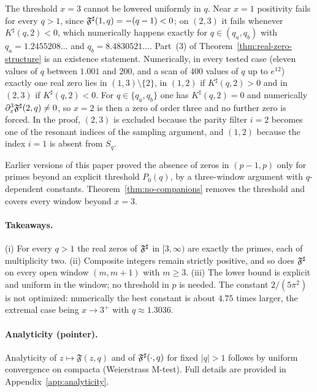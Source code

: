 \begin{remark}\label{rem:exceptional-windows}
The threshold $x=3$ cannot be lowered uniformly in $q$. Near $x=1$ positivity fails for every $q>1$, since $\mathfrak F^{\sharp}(1,q)=-(q-1)<0$; on $(2,3)$ it fails whenever $K^\sharp(q,2)<0$, which numerically happens exactly for $q\in(q_a,q_b)$ with $q_a=1.2455208\ldots$ and $q_b=8.4830521\ldots$. Part~(3) of Theorem~\ref{thm:real-zero-structure} is an existence statement. Numerically, in every tested case (eleven values of $q$ between $1.001$ and $200$, and a scan of $400$ values of $q$ up to $e^{12}$) exactly one real zero lies in $(1,3)\setminus\{2\}$, in $(1,2)$ if $K^\sharp(q,2)>0$ and in $(2,3)$ if $K^\sharp(q,2)<0$. For $q\in\{q_a,q_b\}$ one has $K^\sharp(q,2)=0$ and numerically $\partial_x^3\mathfrak F^{\sharp}(2,q)\neq0$, so $x=2$ is then a zero of order three and no further zero is forced. In the proof, $(2,3)$ is excluded because the parity filter $i=2$ becomes one of the resonant indices of the sampling argument, and $(1,2)$ because the index $i=1$ is absent from $S_q$.
\end{remark}

\begin{remark}
Earlier versions of this paper proved the absence of zeros in $(p-1,p)$ only for primes beyond an explicit threshold $P_0(q)$, by a three-window argument with $q$-dependent constants. Theorem~\ref{thm:no-companions} removes the threshold and covers every window beyond $x=3$.
\end{remark}

\paragraph{Takeaways.}
(i) For every $q>1$ the real zeros of $\mathfrak F^{\sharp}$ in $[3,\infty)$ are exactly the primes, each of multiplicity two. (ii) Composite integers remain strictly positive, and so does $\mathfrak F^{\sharp}$ on every open window $(m,m+1)$ with $m\ge3$. (iii) The lower bound is explicit and uniform in the window; no threshold in $p$ is needed. The constant $2/(5\pi^2)$ is not optimized: numerically the best constant is about $4.75$ times larger, the extremal case being $x\to3^+$ with $q\approx1.3036$.

\paragraph{Analyticity (pointer).} Analyticity of $z\mapsto \mathfrak{F}(z,q)$ and of $\mathfrak F^{\sharp}(\cdot,q)$ for fixed $|q|>1$ follows by uniform convergence on compacta (Weierstrass M-test). Full details are provided in Appendix~\ref{app:analyticity}.

